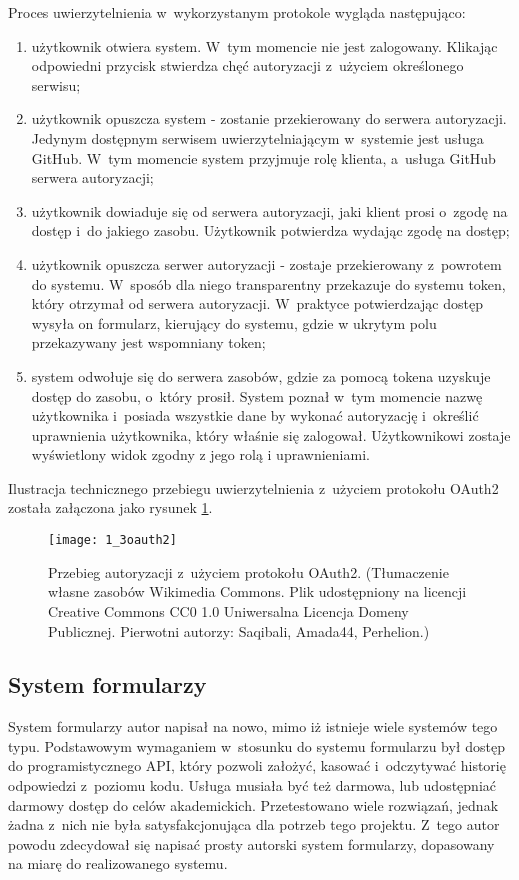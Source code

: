 \medskip
Proces uwierzytelnienia w~wykorzystanym protokole wygląda następująco:
\begin{enumerate}
    \item użytkownik otwiera system. W~tym momencie nie jest zalogowany. Klikając odpowiedni przycisk stwierdza chęć autoryzacji z~użyciem określonego serwisu;
    \item użytkownik opuszcza system - zostanie przekierowany do serwera autoryzacji. Jedynym dostępnym serwisem uwierzytelniającym w~systemie jest usługa GitHub. W~tym momencie system przyjmuje rolę klienta, a~usługa GitHub serwera autoryzacji;
    \item użytkownik dowiaduje się od serwera autoryzacji, jaki klient prosi o~zgodę na dostęp i~do jakiego zasobu. Użytkownik potwierdza wydając zgodę na dostęp;
    \item użytkownik opuszcza serwer autoryzacji - zostaje przekierowany z~powrotem do systemu. W~sposób dla niego transparentny przekazuje do systemu token, który otrzymał od serwera autoryzacji. W~praktyce potwierdzając dostęp wysyła on formularz, kierujący do systemu, gdzie w ukrytym polu przekazywany jest wspomniany token;
    \item system odwołuje się do serwera zasobów, gdzie za pomocą tokena uzyskuje dostęp do zasobu, o~który prosił. System poznał w~tym momencie nazwę użytkownika i~posiada wszystkie dane by wykonać autoryzację i~określić uprawnienia użytkownika, który właśnie się zalogował. Użytkownikowi zostaje wyświetlony widok zgodny z jego rolą i uprawnieniami.
\end{enumerate}

\clearpage
Ilustracja technicznego przebiegu uwierzytelnienia z~użyciem protokołu OAuth2 została załączona jako rysunek \ref{obr13}.

\begin{figure}[!h]
\centering
    \texttt{[image: 1\_3oauth2]}
    \caption[Przebieg uwierzytelnienia z~użyciem protokołu OAuth2]{Przebieg autoryzacji z~użyciem protokołu OAuth2. (Tłumaczenie własne zasobów Wikimedia Commons. Plik udostępniony na licencji Creative Commons CC0 1.0 Uniwersalna Licencja Domeny Publicznej. Pierwotni autorzy: Saqibali, Amada44, Perhelion.)}
    \label{obr13}
\end{figure}


\subsection{System formularzy}

System formularzy autor napisał na nowo, mimo iż istnieje wiele systemów tego typu. Podstawowym wymaganiem w~stosunku do systemu formularzu był dostęp do programistycznego API, który pozwoli założyć, kasować i~odczytywać historię odpowiedzi z~poziomu kodu. Usługa musiała być też darmowa, lub udostępniać darmowy dostęp do celów akademickich. Przetestowano wiele rozwiązań, jednak żadna z~nich nie była satysfakcjonująca dla potrzeb tego projektu. Z~tego autor powodu zdecydował się napisać prosty autorski system formularzy, dopasowany na miarę do realizowanego systemu.


